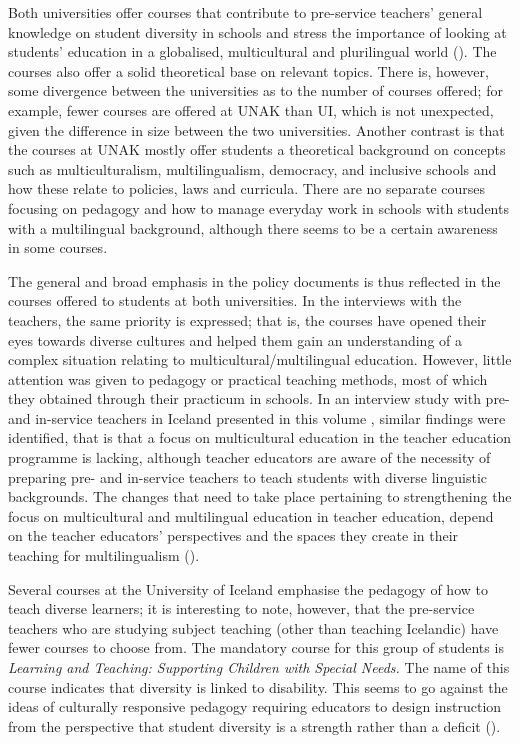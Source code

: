 \documentclass[output=paper]{langscibook}
\begin{document}
Both universities offer courses that contribute to pre-service teachers’ general knowledge on student diversity in schools and stress the importance of looking at students’ education in a globalised, multicultural and plurilingual world (\citealt{Gay2002}). The courses also offer a solid theoretical base on relevant topics. There is, however, some divergence between the universities as to the number of courses offered; for example, fewer courses are offered at UNAK than UI, which is not unexpected, given the difference in size between the two universities. Another contrast is that the courses at UNAK mostly offer students a theoretical background on concepts such as multiculturalism, multilingualism, democracy, and inclusive schools and how these relate to policies, laws and curricula. There are no separate courses focusing on pedagogy and how to manage everyday work in schools with students with a multilingual background, although there seems to be a certain awareness in some courses.

The general and broad emphasis in the policy documents is thus reflected in the courses offered to students at both universities. In the interviews with the teachers, the same priority is expressed; that is, the courses have opened their eyes towards diverse cultures and helped them gain an understanding of a complex situation relating to multicultural/multilingual education. However, little attention was given to pedagogy or practical teaching methods, most of which they obtained through their practicum in schools. In an interview study with pre-and in-service teachers in Iceland presented in this volume \parencite{chapters/4_gudjonsdottir}, similar findings were identified, that is that a focus on multicultural education in the teacher education programme is lacking, although teacher educators are aware of the necessity of preparing pre- and in-service teachers to teach students with diverse linguistic backgrounds. The changes that need to take place pertaining to strengthening the focus on multicultural and multilingual education in teacher education, depend on the teacher educators’ perspectives and the spaces they create in their teaching for multilingualism (\citealt{GoltsevEtAl2022}).

Several courses at the University of Iceland emphasise the pedagogy of how to teach diverse learners; it is interesting to note, however, that the pre-service teachers who are studying subject teaching (other than teaching Icelandic) have fewer courses to choose from. The mandatory course for this group of students is \textit{Learning and Teaching: Supporting Children with Special Needs.} The name of this course indicates that diversity is linked to disability. This seems to go against the ideas of culturally responsive pedagogy requiring educators to design instruction from the perspective that student diversity is a strength rather than a deficit (\citealt{KieranAnderson2019}).
\end{document}

